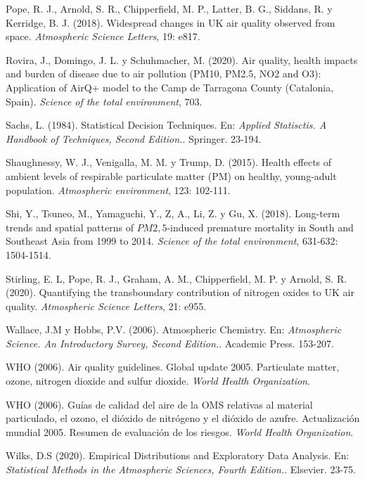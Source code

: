 \documentclass[12pt]{article}
\begin{document}
\begin{thebibliography}{99}
 Pope, R. J., Arnold, S. R., Chipperfield, M. P., Latter, B. G., Siddans, R. y Kerridge, B. J. (2018). Widespread changes in UK air quality observed from space. \textit{Atmospheric Science Letters}, 19: e817.

 Rovira, J., Domingo, J. L. y Schuhmacher, M. (2020). Air quality, health impacts and burden of disease due to air pollution (PM10, PM2.5, NO2 and O3): Application of AirQ+ model to the Camp de Tarragona County (Catalonia, Spain). \textit{Science of the total environment}, 703.

 Sachs, L. (1984). Statistical Decision Techniques. En: \textit{Applied Statisctis. A Handbook of Techniques, Second Edition.}. Springer. 23-194.

 Shaughnessy, W. J., Venigalla, M. M. y Trump, D. (2015). Health effects of ambient levels of respirable particulate matter (PM) on healthy, young-adult population. \textit{Atmospheric environment}, 123: 102-111.

 Shi, Y., Tsuneo, M., Yamaguchi, Y., Z, A., Li, Z. y Gu, X. (2018). Long-term trends and spatial patterns of $PM{2,5}$-induced premature mortality in South and Southeast Asia from 1999 to 2014. \textit{Science of the total environment}, 631-632: 1504-1514.

 Stirling, E. L, Pope, R. J., Graham, A. M., Chipperfield, M. P. y Arnold, S. R. (2020). Quantifying the transboundary contribution of nitrogen oxides to UK air quality. \textit{Atmospheric Science Letters}, 21: e955.

 Wallace, J.M y Hobbs, P.V. (2006). Atmospheric Chemistry. En: \textit{Atmospheric Science. An Introductory Survey, Second Edition.}. Academic Press. 153-207.

 WHO (2006). Air quality guidelines. Global update 2005. Particulate matter, ozone, nitrogen dioxide and sulfur dioxide. \textit{World Health Organization}.

 WHO (2006). Guías de calidad del aire de la OMS relativas al material particulado, el ozono, el dióxido de nitrógeno y el dióxido de azufre. Actualización mundial 2005. Resumen de evaluación de los riesgos. \textit{World Health Organization}.

 Wilks, D.S (2020). Empirical Distributions and Exploratory Data Analysis. En: \textit{Statistical Methods in the Atmospheric Sciences, Fourth Edition.}. Elsevier. 23-75.

\end{thebibliography}
\end{document}
